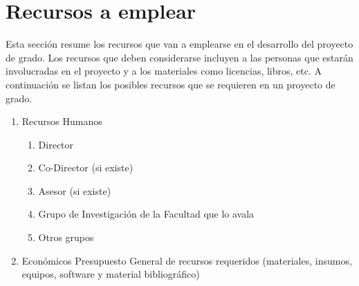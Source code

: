 \section{Recursos a emplear}
Esta sección resume los recursos que van a emplearse en el desarrollo del proyecto de grado. Los recursos que deben considerarse incluyen a las personas que estarán involucradas en el proyecto y a los materiales como licencias, libros, etc.  A continuación se listan los posibles recursos que se requieren en un proyecto de grado.
\begin{enumerate}
    \item Recursos Humanos
    \begin{enumerate}
        \item Director
        \item Co-Director (si existe)
        \item Asesor (si existe)
        \item Grupo de Investigación de la Facultad que lo avala
        \item Otros grupos
    \end{enumerate}
    \item Económicos
    Presupuesto General de recursos requeridos (materiales, insumos, equipos, software y material bibliográfico)
\end{enumerate}